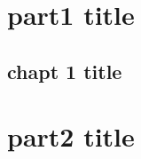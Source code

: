 \documentclass[12pt, a4paper, twoside]{report}
\begin{document}
\hspace{0pt}
\newpage
\tableofcontents



\newpage
\printnomenclature



\newpage
\listoftables
\newpage
\listoffigures



% 



% 






\part{part1 title}

\chapter{chapt 1 title}


\lipsum[2]


\part[Phần II: part2 title]{part2 title}
\end{document}
